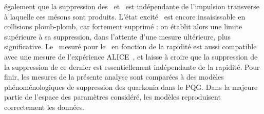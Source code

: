 également que la suppression des \PgUa\ et \PgUb\ est indépendante de
l'impulsion transverse à laquelle ces mésons sont produits. L'état
excité \PgUc\ est encore insaisissable en collisions plomb-plomb, car
fortement supprimé : on établit alors une limite supérieure à sa
suppression, dans l'attente d'une mesure ultérieure, plus
significative. Le \RAA\ mesuré pour le \PgUa\ en fonction de la
rapidité est aussi compatible avec une mesure de l'expérience ALICE~\cite{ALICEUpsilonHI},
et laisse à croire que la suppression de la suppression de ce dernier est
essentiellement indépendante de la rapidité. Pour finir, les mesures
de la présente analyse sont comparées à des modèles phénoménologiques
de suppression des quarkonia dans le PQG. Dans la majeure partie de
l'espace des paramètres considéré, les modèles reproduisent
correctement les données.
